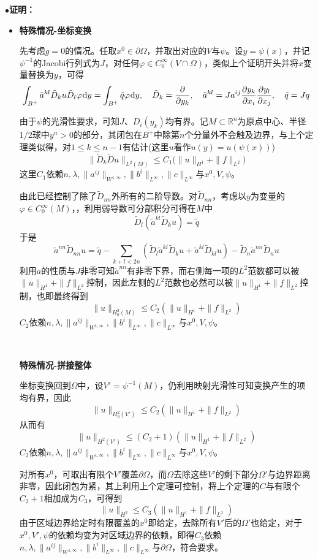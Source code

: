 \documentclass[a4paper,UTF8,fontset=windows,AutoFakeBold]{ctexart}
\newcommand*{\dr}{\hspace{0.07em}\mathrm{d}}
\newcommand{\proo}[1]{{\kaishu $\bullet$\textbf{证明：}
\begin{itemize}
    \item[] #1
\end{itemize}
}}
\begin{document}
\proo{
    \textbf{特殊情况-坐标变换}

    先考虑$g=0$的情况。任取$x^0\in\partial\Omega$，并取出对应的$V$与$\psi$。设$y=\psi(x)$，并记$\psi^{-1}$的Jacobi行列式为$J$，对任何$\varphi\in C_0^\infty(V\cap\Omega)$，类似上个证明开头并将$x$变量替换为$y$，可得
    $$\int_{B^+}\tilde{a}^{kl}\tilde{D}_ku\tilde{D}_l\varphi\dr y=\int_{B^+}\tilde{q}\varphi\dr y,\quad\tilde{D}_k=\frac{\partial}{\partial y_k},\quad\tilde{a}^{kl}=Ja^{ij}\frac{\partial y_k}{\partial x_i}\frac{\partial y_l}{\partial x_j},\quad\tilde{q}=Jq$$

    由于$\psi$的光滑性要求，可知$J$、$D_i(y_k)$均有界。记$M\subset\mathbb{R}^n$为原点中心、半径$1/2$球中$y^n>0$的部分，其闭包在$B^+$中除第$n$个分量外不会触及边界，与上个定理类似得，对$1\le k\le n-1$有估计(这里$u$看作$u(y)=u(\psi(x))$)
    $$\|\tilde{D}_k\tilde{D}u\|_{L^2(M)}\le C_1\big(\|u\|_{H^1}+\|f\|_{L^2}\big)$$
    这里$C_1$依赖$n,\lambda,\|a^{ij}\|_{W^{1,\infty}},\|b^i\|_{L^\infty},\|c\|_{L^\infty}$与$x^0,V,\psi$。

    由此已经控制了除了$\tilde{D}_{nn}$外所有的二阶导数。对$\tilde{D}_{nn}$，考虑以$y$为变量的$\varphi\in C_0^\infty(M)$，，利用弱导数可分部积分可得在$M$中
    $$\tilde{D}_l(\tilde{a}^{kl}\tilde{D}_ku)=\tilde{q}$$
    于是
    $$\tilde{a}^{nn}\tilde{D}_{nn}u=\tilde{q}-\sum_{k+l<2n}(\tilde{D}_l\tilde{a}^{kl}\tilde{D}_ku+\tilde{a}^{kl}\tilde{D}_{kl}u)-\tilde{D}_n\tilde{a}^{nn}\tilde{D}_nu$$
    利用$a$的性质与$J$非零可知$\tilde{a}^{nn}$有非零下界，而右侧每一项的$L^2$范数都可以被$\|u\|_{H^1}+\|f\|_{L^2}$控制，因此左侧的$L^2$范数也必然可以被$\|u\|_{H^1}+\|f\|_{L^2}$控制，也即最终得到
    $$\|u\|_{H_0^2(M)}\le C_2(\|u\|_{H^1}+\|f\|_{L^2})$$
    $C_2$依赖$n,\lambda,\|a^{ij}\|_{W^{1,\infty}},\|b^i\|_{L^\infty},\|c\|_{L^\infty}$与$x^0,V,\psi$。
    
    \

    \textbf{特殊情况-拼接整体}

    坐标变换回到$\Omega$中，设$V'=\psi^{-1}(M)$，仍利用映射光滑性可知变换产生的项均有界，因此
    $$\|u\|_{H_0^2(V')}\le C_2(\|u\|_{H^1}+\|f\|_{L^2})$$
    从而有
    $$\|u\|_{H^2(V')}\le(C_2+1)(\|u\|_{H^1}+\|f\|_{L^2})$$
    $C_2$依赖$n,\lambda,\|a^{ij}\|_{W^{1,\infty}},\|b^i\|_{L^\infty},\|c\|_{L^\infty}$与$x^0,V,\psi$。

    对所有$x^0$，可取出有限个$V'$覆盖$\partial\Omega$，而$\Omega$去除这些$V'$的剩下部分$\Omega'$与边界距离非零，因此闭包为紧，其上利用上个定理可控制，将上个定理的$C$与有限个$C_2+1$相加成为$C_3$，可得到
    $$\|u\|_{H^2}\le C_3(\|u\|_{H^1}+\|f\|_{L^2})$$
    由于区域边界给定时有限覆盖的$x^0$即给定，去除所有$V'$后的$\Omega'$也给定，对于$x^0,V',\psi$的依赖均变为对区域边界的依赖，即得$C_3$依赖$n,\lambda,\|a^{ij}\|_{W^{1,\infty}},\|b^i\|_{L^\infty},\|c\|_{L^\infty}$与$\partial\Omega$，符合要求。

}
\end{document}
